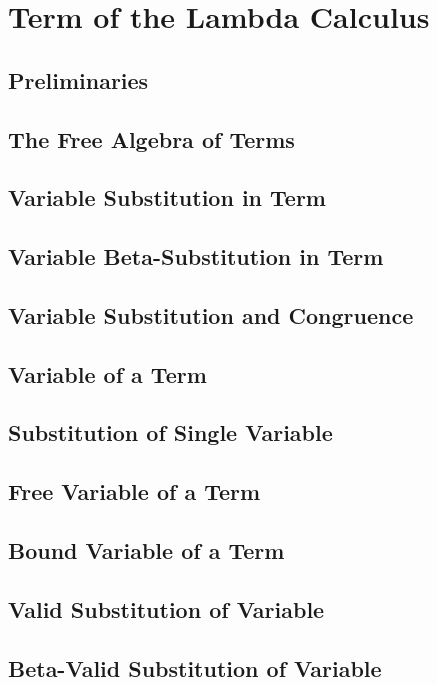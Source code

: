\section{Term of the Lambda Calculus}
    \subsection{Preliminaries}
        
    \subsection{The Free Algebra of Terms}
        
    \subsection{Variable Substitution in Term}
        
    \subsection{Variable Beta-Substitution in Term}
        
    \subsection{Variable Substitution and Congruence}
        
    \subsection{Variable of a Term}
        
    \subsection{Substitution of Single Variable}
        
    \subsection{Free Variable of a Term}
        
    \subsection{Bound Variable of a Term}
        
    \subsection{Valid Substitution of Variable}
      
     \subsection{Beta-Valid Substitution of Variable}
        

